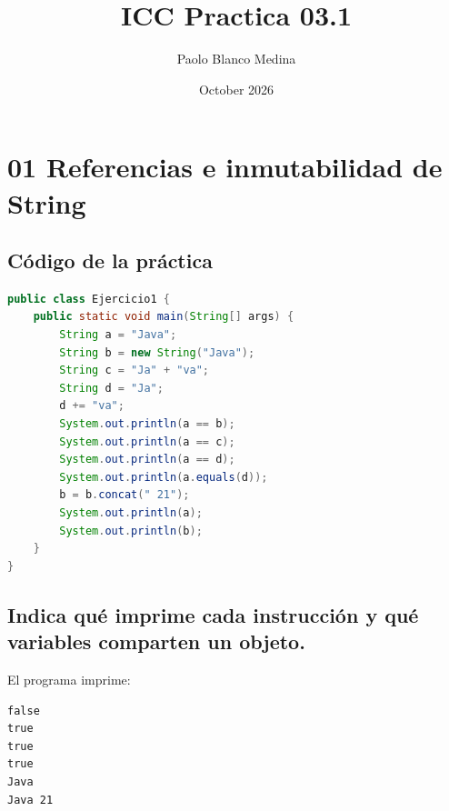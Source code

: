 \documentclass{article}
\title{ICC Practica 03.1}
\author{Paolo Blanco Medina}
\date{October 2026}
\begin{document}
\maketitle
\section*{01 Referencias e inmutabilidad de String}
\subsection*{Código de la práctica}
\begin{lstlisting}[language=Java]
public class Ejercicio1 {
    public static void main(String[] args) {
        String a = "Java";
        String b = new String("Java");
        String c = "Ja" + "va";
        String d = "Ja";
        d += "va";
        System.out.println(a == b);
        System.out.println(a == c);
        System.out.println(a == d);
        System.out.println(a.equals(d));
        b = b.concat(" 21");
        System.out.println(a);
        System.out.println(b);
    }
}
\end{lstlisting}

\subsection*{Indica qué imprime cada instrucción y qué variables comparten un objeto.}
El programa imprime:
\begin{verbatim}
false
true
true
true
Java
Java 21
\end{verbatim}
\end{document}
